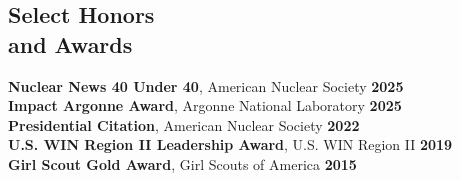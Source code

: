 \documentclass[margin,line]{resume}
\begin{document}
\begin{resume}
    \section{\mysidestyle Select Honors \\and Awards}
    \textbf{Nuclear News 40 Under 40}, American Nuclear Society \hfill \textbf{2025}\vspace{.5mm}\\
    \textbf{Impact Argonne Award}, Argonne National Laboratory \hfill \textbf{2025}\vspace{.5mm}\\
    \textbf{Presidential Citation}, American Nuclear Society \hfill \textbf{2022}\vspace{.5mm}\\
    \textbf{U.S. WIN Region II Leadership Award}, U.S. WIN Region II \hfill \textbf{2019}\vspace{.5mm}\\%
    \textbf{Girl Scout Gold Award}, Girl Scouts of America \hfill \textbf{2015}\vspace{.5mm}\\%
    \vspace{-8mm}


\end{resume}
\end{document}
